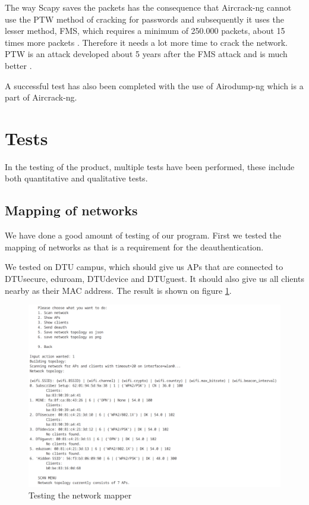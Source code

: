 The way Scapy saves the packets has the consequence that Aircrack-ng cannot use the PTW method of cracking for passwords and subsequently it uses the lesser method, FMS, which requires a minimum of 250.000 packets, about 15 times more packets \cite{Weakness}. Therefore it needs a lot more time to crack the network. PTW is an attack developed about 5 years after the FMS attack and is much better \cite{PTW}.


A successful test has also been completed with the use of Airodump-ng which is a part of Aircrack-ng.

\section{Tests}
In the testing of the product, multiple tests have been performed, these include both quantitative and qualitative tests. 
\subsection{Mapping of networks}
We have done a good amount of testing of our program. First we tested the mapping of networks as that is a requirement for the deauthentication. 

We tested on DTU campus, which should give us APs that are connected to DTUsecure, eduroam, DTUdevice and DTUguest. It should also give us all clients nearby as their MAC address. The result is shown on figure \ref{test1}.

\begin{figure}[!htbp]
    \centering
    \includegraphics[width=\textwidth]{Latex-Files/Billeder/Tests/scan_network.png}
    \caption{Testing the network mapper}
    \label{test1}
\end{figure}

